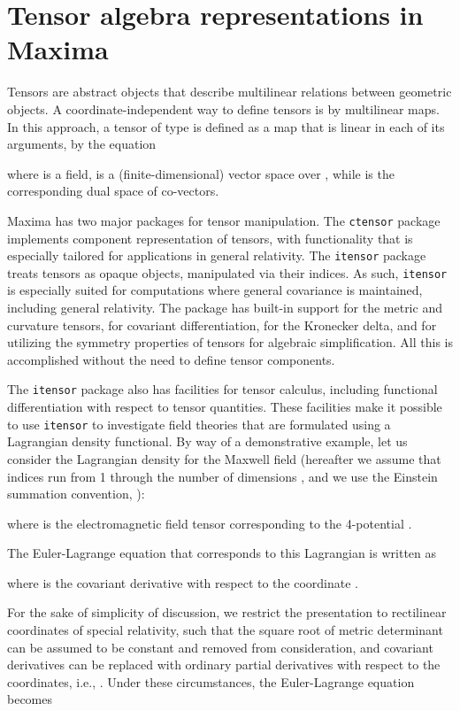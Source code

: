 \documentclass[twoside,reqno,11pt]{amsart}
\theoremstyle{definition}
\theoremstyle{remark}
\numberwithin{equation}{section}
\newcommand{\symb}[1]{{\tt #1}}
\begin{document}
\section{Tensor algebra representations in Maxima}
\label{sec:itensor}

Tensors are abstract objects that describe multilinear relations between geometric objects.
A coordinate-independent way to define tensors is by multilinear maps.
In this approach, a tensor  of type  is defined as a map that is linear in each of its arguments, by the equation

where  is a field,  is a (finite-dimensional) vector space over , while  is the corresponding dual space of co-vectors.

Maxima has two major packages for tensor manipulation. The \symb{ctensor} package implements component representation of tensors, with functionality that is especially tailored for applications in general relativity. The \symb{itensor} package treats tensors as opaque objects, manipulated via their indices. As such, \symb{itensor} is especially suited for computations where general covariance is maintained, including general relativity. The package has built-in support for the metric and curvature tensors, for covariant differentiation, for the Kronecker delta, and for utilizing the symmetry properties of tensors for algebraic simplification. All this is accomplished without the need to define tensor components.

The \symb{itensor} package also has facilities for tensor calculus, including functional differentiation with respect to tensor quantities. These facilities make it possible to use \symb{itensor} to investigate field theories that are formulated using a Lagrangian density functional. By way of a demonstrative example, let us consider the Lagrangian density for the Maxwell field (hereafter we assume that indices run from 1 through the number of dimensions , and we use the Einstein summation convention, ):

where  is the electromagnetic field tensor corresponding to the 4-potential .

The Euler-Lagrange equation that corresponds to this Lagrangian is written as


where  is the covariant derivative with respect to the coordinate .

For the sake of simplicity of discussion, we restrict the presentation to rectilinear coordinates of special relativity, such that the square root of metric determinant  can be assumed to be constant and removed from consideration, and covariant derivatives can be replaced with ordinary partial derivatives with respect to the coordinates, i.e., . Under these circumstances, the Euler-Lagrange equation becomes
\end{document}
